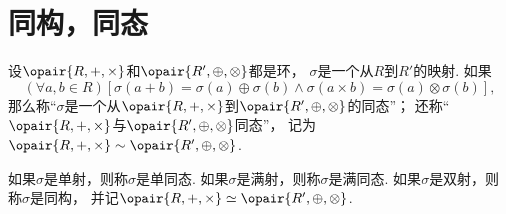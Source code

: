 \section{同构，同态}
\begin{definition}
设\(\opair{R,+,\times}\)和\(\opair{R',\oplus,\otimes}\)都是环，
\(\sigma\)是一个从\(R\)到\(R'\)的映射.
如果\[
	(\forall a,b\in R)[
		\sigma(a+b)=\sigma(a)\oplus\sigma(b)
		\land
		\sigma(a \times b)=\sigma(a)\otimes\sigma(b)
	],
\]
那么称“\(\sigma\)是一个从\(\opair{R,+,\times}\)到\(\opair{R',\oplus,\otimes}\)的同态”；
还称“\(\opair{R,+,\times}\)与\(\opair{R',\oplus,\otimes}\)同态”，
记为\(\opair{R,+,\times} \sim \opair{R',\oplus,\otimes}\).

如果\(\sigma\)是单射，则称\(\sigma\)是单同态.
如果\(\sigma\)是满射，则称\(\sigma\)是满同态.
如果\(\sigma\)是双射，则称\(\sigma\)是同构，
并记\(\opair{R,+,\times} \simeq \opair{R',\oplus,\otimes}\).
\end{definition}
